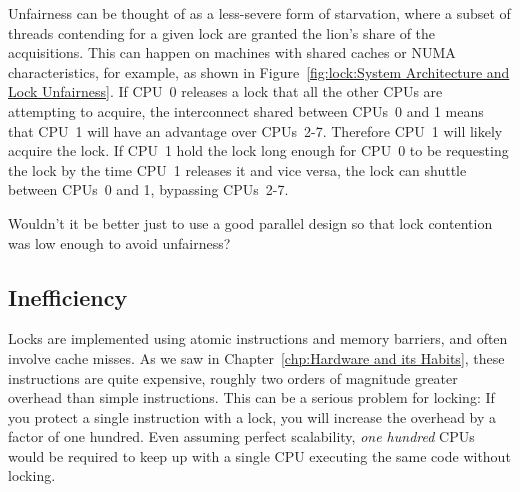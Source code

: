 Unfairness can be thought of as a less-severe form of starvation,
where a subset of threads contending for a given lock are granted
the lion's share of the acquisitions.
This can happen on machines with shared caches or NUMA characteristics,
for example, as shown in
Figure~\ref{fig:lock:System Architecture and Lock Unfairness}.
If CPU~0 releases a lock that all the other CPUs are attempting
to acquire, the interconnect shared between CPUs~0 and 1 means that
CPU~1 will have an advantage over CPUs~2-7.
Therefore CPU~1 will likely acquire the lock.
If CPU~1 hold the lock long enough for CPU~0 to be requesting the
lock by the time CPU~1 releases it and vice versa, the lock can
shuttle between CPUs~0 and 1, bypassing CPUs~2-7.

\QuickQuiz{}
	Wouldn't it be better just to use a good parallel design
	so that lock contention was low enough to avoid unfairness?
 \QuickQuizEnd

\subsection{Inefficiency}
\label{sec:locking:Inefficiency}

Locks are implemented using atomic instructions and memory barriers,
and often involve cache misses.
As we saw in Chapter~\ref{chp:Hardware and its Habits},
these instructions are quite expensive, roughly two
orders of magnitude greater overhead than simple instructions.
This can be a serious problem for locking: If you protect a single
instruction with a lock, you will increase the overhead by a factor
of one hundred.
Even assuming perfect scalability, \emph{one hundred} CPUs would
be required to keep up with a single CPU executing the same code
without locking.

